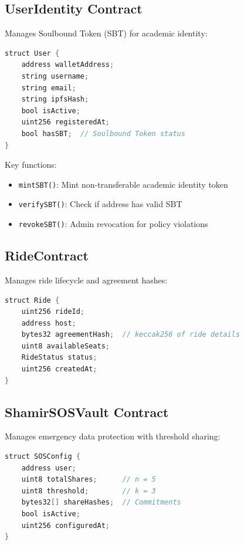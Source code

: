 \documentclass[12pt]{report}
\theoremstyle{plain}
\theoremstyle{definition}
\theoremstyle{remark}
\begin{document}
\subsection{UserIdentity Contract}

Manages Soulbound Token (SBT) for academic identity:

\begin{lstlisting}[language=Java, caption=UserIdentity Contract Structure]
struct User {
    address walletAddress;
    string username;
    string email;
    string ipfsHash;
    bool isActive;
    uint256 registeredAt;
    bool hasSBT;  // Soulbound Token status
}
\end{lstlisting}

Key functions:
\begin{itemize}
    \item \texttt{mintSBT()}: Mint non-transferable academic identity token
    \item \texttt{verifySBT()}: Check if address has valid SBT
    \item \texttt{revokeSBT()}: Admin revocation for policy violations
\end{itemize}

\subsection{RideContract}

Manages ride lifecycle and agreement hashes:

\begin{lstlisting}[language=Java, caption=Ride Agreement Structure]
struct Ride {
    uint256 rideId;
    address host;
    bytes32 agreementHash;  // keccak256 of ride details
    uint8 availableSeats;
    RideStatus status;
    uint256 createdAt;
}
\end{lstlisting}

\subsection{ShamirSOSVault Contract}

Manages emergency data protection with threshold sharing:

\begin{lstlisting}[language=Java, caption=SOS Vault Structure]
struct SOSConfig {
    address user;
    uint8 totalShares;      // n = 5
    uint8 threshold;        // k = 3
    bytes32[] shareHashes;  // Commitments
    bool isActive;
    uint256 configuredAt;
}
\end{lstlisting}
\end{document}

